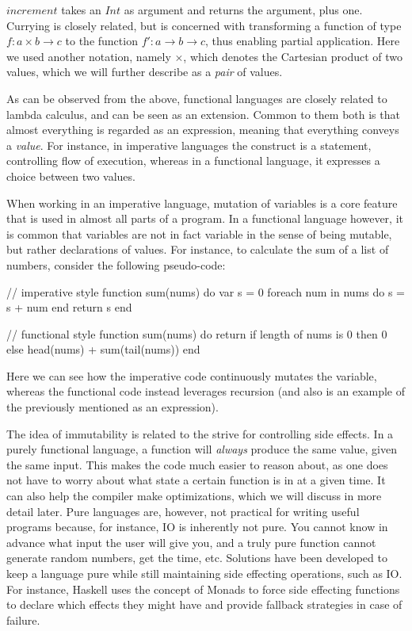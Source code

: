 $increment$ takes an $Int$ as argument and returns the argument, plus one. Currying is closely related, but is concerned with transforming a function of type $f : a \times b \to c$ to the function $f' : a \to b \to c$, thus enabling partial application. Here we used another notation, namely $\times$, which denotes the Cartesian product of two values, which we will further describe as a \emph{pair} of values.

As can be observed from the above, functional languages are closely related to lambda calculus, and can be seen as an extension. Common to them both is that almost everything is regarded as an expression, meaning that everything conveys a \emph{value}. For instance, in imperative languages the  construct is a statement, controlling flow of execution, whereas in a functional language, it expresses a choice between two values.

When working in an imperative language, mutation of variables is a core feature that is used in almost all parts of a program. In a functional language however, it is common that variables are not in fact variable in the sense of being mutable, but rather declarations of values. For instance, to calculate the sum of a list of numbers, consider the following pseudo-code:

\begin{pseudo}
// imperative style
function sum(nums) do
  var s = 0
  foreach num in nums do
    s = s + num
  end
  return s
end

// functional style
function sum(nums) do
  return if length of nums is 0
    then 0
    else head(nums) + sum(tail(nums))
end
\end{pseudo}

Here we can see how the imperative code continuously mutates the  variable, whereas the functional code instead leverages recursion (and also is an example of the previously mentioned  as an expression).

The idea of immutability is related to the strive for controlling side effects. In a purely functional language, a function will \emph{always} produce the same value, given the same input. This makes the code much easier to reason about, as one does not have to worry about what state a certain function is in at a given time. It can also help the compiler make optimizations, which we will discuss in more detail later. Pure languages are, however, not practical for writing useful programs because, for instance, IO is inherently not pure. You cannot know in advance what input the user will give you, and a truly pure function cannot generate random numbers, get the time, etc. Solutions have been developed to keep a language pure while still maintaining side effecting operations, such as IO. For instance, Haskell uses the concept of Monads to force side effecting functions to declare which effects they might have and provide fallback strategies in case of failure.


